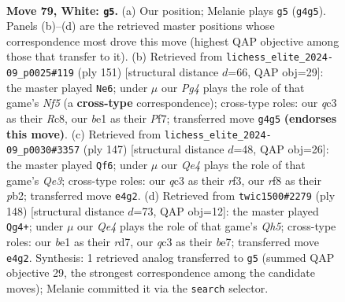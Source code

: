 \documentclass[11pt]{article}
\begin{document}
\clearpage

\begin{figure}[p]\centering
\begin{subfigure}{0.46\textwidth}\centering
\resizebox{\linewidth}{!}{%
\newchessgame
\chessboard[
  setfen={1k3r1r/p5p1/7p/7P/3PQ1P1/2q1P3/7N/4b2K w - - 7 79},
  showmover=false,
  pgfstyle=straightmove, color=movearrow, markmove={g4-g5}
]}
\caption{}
\end{subfigure}\hfill
\begin{subfigure}{0.46\textwidth}\centering
\resizebox{\linewidth}{!}{%
\newchessgame
\chessboard[
  setfen={2r5/2P1qpk1/2R5/1Q2p1p1/4Pn2/2R5/8/2K5 b - - 1 76},
  showmover=false,
  pgfstyle=straightmove, color=movearrow, markmove={f4-e6}
]}
\caption{}
\end{subfigure}
\\[4pt]
\begin{subfigure}{0.46\textwidth}\centering
\resizebox{\linewidth}{!}{%
\newchessgame
\chessboard[
  setfen={8/6k1/4q1p1/5p1p/7P/1p3RP1/1P3R1K/8 b - - 1 74},
  showmover=false,
  pgfstyle=straightmove, color=movearrow, markmove={e6-f6}
]}
\caption{}
\end{subfigure}\hfill
\begin{subfigure}{0.46\textwidth}\centering
\resizebox{\linewidth}{!}{%
\newchessgame
\chessboard[
  setfen={3r4/3rb1k1/1p6/p6Q/P6P/1P2N1PK/8/8 w - - 1 75},
  showmover=false,
  pgfstyle=straightmove, color=movearrow, markmove={h5-g4}
]}
\caption{}
\end{subfigure}
\caption{\textbf{Move 79, White: \texttt{g5}.} (a) Our position; Melanie plays \texttt{g5} (\texttt{g4g5}). Panels (b)--(d) are the retrieved master positions whose correspondence most drove this move (highest QAP objective among those that transfer to it). (b) Retrieved from \texttt{lichess\_elite\_2024-09\_p0025\#119} (ply 151) [structural distance $d$=66, QAP obj=29]: the master played \texttt{Ne6}; under $\mu$ our \emph{Pg4} plays the role of that game's \emph{Nf5} (a \textbf{cross-type} correspondence); cross-type roles: our \emph{q}c3 as their \emph{R}c8, our \emph{b}e1 as their \emph{P}f7; transferred move \texttt{g4g5} \textbf{(endorses this move)}. (c) Retrieved from \texttt{lichess\_elite\_2024-09\_p0030\#3357} (ply 147) [structural distance $d$=48, QAP obj=26]: the master played \texttt{Qf6}; under $\mu$ our \emph{Qe4} plays the role of that game's \emph{Qe3}; cross-type roles: our \emph{q}c3 as their \emph{r}f3, our \emph{r}f8 as their \emph{p}b2; transferred move \texttt{e4g2}. (d) Retrieved from \texttt{twic1500\#2279} (ply 148) [structural distance $d$=73, QAP obj=12]: the master played \texttt{Qg4+}; under $\mu$ our \emph{Qe4} plays the role of that game's \emph{Qh5}; cross-type roles: our \emph{b}e1 as their \emph{r}d7, our \emph{q}c3 as their \emph{b}e7; transferred move \texttt{e4g2}. Synthesis: 1 retrieved analog transferred to \texttt{g5} (summed QAP objective 29, the strongest correspondence among the candidate moves); Melanie committed it via the \texttt{search} selector.}
\label{fig:thought-m156}
\end{figure}
\end{document}

